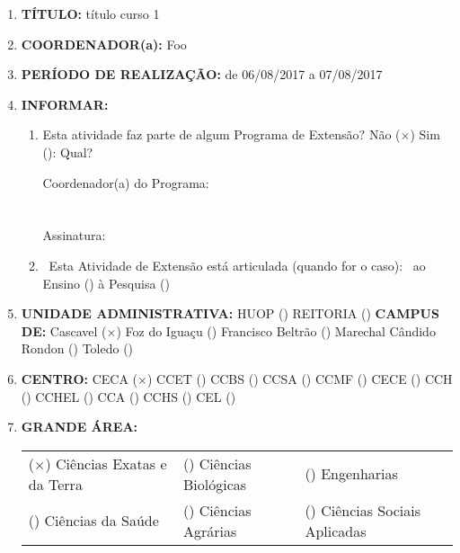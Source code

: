\documentclass[12pt,a4paper,oneside]{article}%
\begin{document}
\begin{enumerate}%
\item%
\textbf{TÍTULO: }%
título curso 1%
\item%
\textbf{COORDENADOR(a): }%
Foo%
\item%
\textbf{PERÍODO DE REALIZAÇÃO: }%
de 06/08/2017 a 07/08/2017%
\item%
\textbf{INFORMAR: }%
\begin{mdframed}[innertopmargin=5pt, innerleftmargin=3pt, innerrightmargin=3pt]%
\begin{enumerate}%
\scriptsize%
\item%
Esta atividade faz parte de algum Programa de Extensão? %
Não ($\times$) Sim (\phantom{$\times$}): Qual? %

Coordenador(a) do Programa: \\ \\ \\
Assinatura: \hrulefill \\
\item%
\
                                      Esta Atividade de Extensão está articulada (quando for o caso): \
                                      ao Ensino (\phantom{$\times$}) à Pesquisa (\phantom{$\times$})%
\end{enumerate}%
\end{mdframed}%
\item%
\textbf{UNIDADE ADMINISTRATIVA: }%
HUOP (\phantom{$\times$}) %
REITORIA (\phantom{$\times$}) %
\newline%
\textbf{CAMPUS DE: }%
Cascavel ($\times$) %
Foz do Iguaçu (\phantom{$\times$}) %
Francisco Beltrão (\phantom{$\times$}) %
Marechal Cândido Rondon (\phantom{$\times$}) %
Toledo (\phantom{$\times$}) %
\item%
\textbf{CENTRO: }%
\newline%
CECA ($\times$) %
CCET (\phantom{$\times$}) %
CCBS (\phantom{$\times$}) %
CCSA (\phantom{$\times$}) %
CCMF (\phantom{$\times$}) %
CECE (\phantom{$\times$}) %
CCH (\phantom{$\times$}) %
CCHEL (\phantom{$\times$}) %
CCA (\phantom{$\times$}) %
CCHS (\phantom{$\times$}) %
CEL (\phantom{$\times$}) %
\item%
\textbf{GRANDE ÁREA: }%
\newline%
\begin{tabularx}{\linewidth}{|X|X|X|}%
\hline%
($\times$) Ciências Exatas e da Terra&(\phantom{$\times$}) Ciências Biológicas &(\phantom{$\times$}) Engenharias \\%
(\phantom{$\times$}) Ciências da Saúde &(\phantom{$\times$}) Ciências Agrárias &(\phantom{$\times$}) Ciências Sociais Aplicadas \\%

\end{tabularx}
\end{enumerate}
\end{document}
